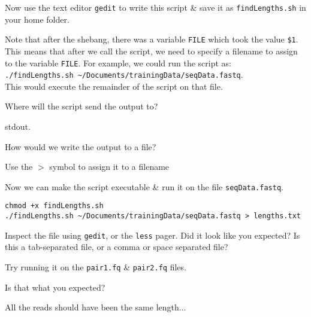 \begin{steps}
Now use the text editor \texttt{gedit} to write this script \& save it as \texttt{findLengths.sh} in your home folder.
\end{steps}

\begin{note}
Note that after the shebang, there was a variable \texttt{FILE} which took the value \texttt{\$1}.
This means that after we call the script, we need to specify a filename to assign to the variable \texttt{FILE}.
For example, we could run the script as: \\
\texttt{./findLengths.sh \~{}/Documents/trainingData/seqData.fastq}.\\
This would execute the remainder of the script on that file. \\
\end{note}

\begin{questions}
Where will the script send the output to?
\begin{answer}
stdout.
\end{answer}

How would we write the output to a file?
\begin{answer}
Use the $>$ symbol to assign it to a filename
\end{answer}
\end{questions}

\begin{steps}
Now we can make the script executable \& run it on the file \texttt{seqData.fastq}.
\begin{lstlisting}
chmod +x findLengths.sh
./findLengths.sh ~/Documents/trainingData/seqData.fastq > lengths.txt
\end{lstlisting}
\end{steps}

\begin{questions}
Inspect the file using \texttt{gedit}, or the \texttt{less} pager.
Did it look like you expected? 
Is this a tab-separated file, or a comma or space separated file?
\end{questions}

\begin{bonus}
Try running it on the \texttt{pair1.fq} \& \texttt{pair2.fq} files.
\begin{questions}
Is that what you expected?
\begin{answer}
All the reads should have been the same length...
\end{answer}
\end{questions}
\end{bonus}

